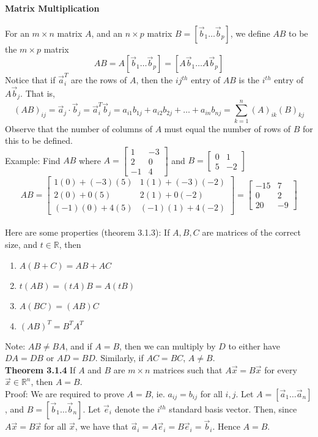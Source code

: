 \documentclass[10pt,letter]{article}
\begin{document}
\paragraph{Matrix Multiplication} For an $m\times n$ matrix $A$, and an $n\times p$ matrix $B=[\vec{b}_1\ldots\vec{b}_p]$, we define $AB$ to be the $m\times p$ matrix $$AB=A[\vec{b}_1\ldots\vec{b}_p]=[A\vec{b}_1\ldots A\vec{b}_p]$$ Notice that if $\vec{a}_i^T$ are the rows of $A$, then the $ij^{th}$ entry of $AB$ is the $i^{th}$ entry of $A\vec{b}_j$. That is, $$(AB)_{ij} = \vec{a}_j\cdot\vec{b}_j=\vec{a}_i^T\vec{b}_j=a_{i1}b_{1j}+a_{i2}b_{2j}+\ldots+a_{in}b_{nj}=\sum_{k=1}^n(A)_{ik}(B)_{kj}$$ Observe that the number of columns of $A$ must equal the number of rows of $B$ for this to be defined. \\ 
Example: Find $AB$ where $A=\begin{bmatrix}1&-3\\2&0\\-1&4\end{bmatrix}$ and $B=\begin{bmatrix}0&1\\5&-2\end{bmatrix}$\\ 
$$AB = \begin{bmatrix}1(0)+(-3)(5)&1(1)+(-3)(-2)\\2(0)+0(5)&2(1)+0(-2) \\ (-1)(0)+4(5)& (-1)(1)+4(-2)\end{bmatrix}= \begin{bmatrix}-15&7\\0&2\\20&-9\end{bmatrix}$$\\ 
Here are some properties (theorem 3.1.3): If $A,B,C$ are matrices of the correct size, and $t\in\mathbb{R}$, then \begin{enumerate}
    \item $A(B+C) = AB+AC$ 
    \item $t(AB)=(tA)B=A(tB)$ 
    \item $A(BC)=(AB)C$ 
    \item $(AB)^T = B^TA^T$
\end{enumerate}
Note: $AB\neq BA$, and if $A=B$, then we can multiply by $D$ to either have $DA=DB$ or $AD=BD$. Similarly, if $AC=BC$, $A\neq B$.  \\ 
\textbf{Theorem 3.1.4} If $A$ and $B$ are $m\times n$ matrices such that $A\vec{x}=B\vec{x}$ for every $\vec{x}\in\mathbb{R}^n$, then $A=B$. \\ 
Proof: We are required to prove $A=B$, ie. $a_{ij}=b_{ij}$ for all $i,j$. Let $A=[\vec{a}_1\ldots\vec{a}_n]$, and $B=[\vec{b}_1\ldots\vec{b}_n]$. Let $\vec{e}_i$ denote the $i^{th}$ standard basis vector. Then, since $A\vec{x}=B\vec{x}$ for all $\vec{x}$, we have that $\vec{a}_i=A\vec{e}_i=B\vec{e}_i=\vec{b}_i$. Hence $A=B$. 
\end{document}
